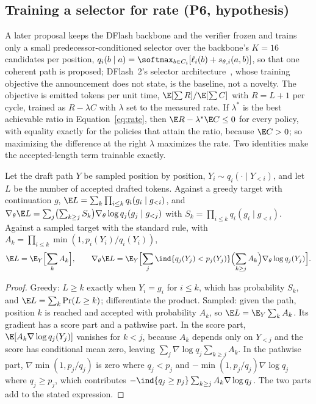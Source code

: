 \subsection{Training a selector for rate (P6, hypothesis)}\label{app:selector}\label{sec:drafter-selector}
A later proposal keeps the DFlash backbone and the verifier frozen and trains only a small predecessor-conditioned selector over the backbone's $K=16$ candidates per position, $q_i(b\mid a)=\softmax_{b\in C_i}[\ell_i(b)+s_{\theta,i}(a,b)]$, so that one coherent path is proposed; DFlash~2's selector architecture~\cite{dflash}, whose training objective the announcement does not state, is the baseline, not a novelty. The objective is emitted tokens per unit time, $\E[\sum R]/\E[\sum C]$ with $R=L+1$ per cycle, trained as $R-\lambda C$ with $\lambda$ set to the measured rate. If $\lambda^\ast$ is the best achievable ratio in Equation~\eqref{eq:rate}, then $\E R-\lambda^\ast\E C\le0$ for every policy, with equality exactly for the policies that attain the ratio, because $\E C>0$; so maximizing the difference at the right $\lambda$ maximizes the rate. Two identities make the accepted-length term trainable exactly.
\begin{proposition}\label{prop:prefix-value}
Let the draft path $Y$ be sampled position by position, $Y_i\sim q_i(\cdot\mid Y_{<i})$, and let $L$ be the number of accepted drafted tokens. Against a greedy target with continuation $g$, $\E L=\sum_k\prod_{i\le k}q_i(g_i\mid g_{<i})$, and $\nabla_\theta\E L=\sum_j\bigl(\sum_{k\ge j}S_k\bigr)\nabla_\theta\log q_j(g_j\mid g_{<j})$ with $S_k=\prod_{i\le k}q_i(g_i\mid g_{<i})$. Against a sampled target with the standard rule, with $A_k=\prod_{i\le k}\min(1,p_i(Y_i)/q_i(Y_i))$,
\[\E L=\E_Y\Bigl[\sum_kA_k\Bigr],\qquad\nabla_\theta\E L=\E_Y\Bigl[\sum_j\ind\{q_j(Y_j)<p_j(Y_j)\}\Bigl(\sum_{k\ge j}A_k\Bigr)\nabla_\theta\log q_j(Y_j)\Bigr].\]
\end{proposition}
\begin{proof}
Greedy: $L\ge k$ exactly when $Y_i=g_i$ for $i\le k$, which has probability $S_k$, and $\E L=\sum_k\Pr(L\ge k)$; differentiate the product. Sampled: given the path, position $k$ is reached and accepted with probability $A_k$, so $\E L=\E_Y\sum_kA_k$. Its gradient has a score part and a pathwise part. In the score part, $\E[A_k\nabla\log q_j(Y_j)]$ vanishes for $k<j$, because $A_k$ depends only on $Y_{<j}$ and the score has conditional mean zero, leaving $\sum_j\nabla\log q_j\sum_{k\ge j}A_k$. In the pathwise part, $\nabla\min(1,p_j/q_j)$ is zero where $q_j<p_j$ and $-\min(1,p_j/q_j)\nabla\log q_j$ where $q_j\ge p_j$, which contributes $-\ind\{q_j\ge p_j\}\sum_{k\ge j}A_k\nabla\log q_j$. The two parts add to the stated expression.
\end{proof}
